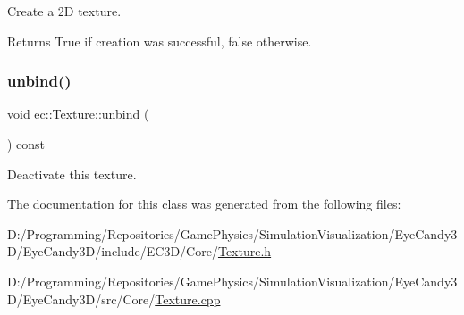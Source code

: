 Create a 2D texture. 

\begin{DoxyReturn}{Returns}
True if creation was successful, false otherwise. 
\end{DoxyReturn}
\mbox{\label{classec_1_1_texture_a95c72abc5c801df231fc970c6adffdcc}} 
\subsubsection{\texorpdfstring{unbind()}{unbind()}}
{\footnotesize\ttfamily void ec\+::\+Texture\+::unbind (\begin{DoxyParamCaption}{ }\end{DoxyParamCaption}) const}

Deactivate this texture. 

The documentation for this class was generated from the following files\+:\begin{DoxyCompactItemize}
\item 
D\+:/\+Programming/\+Repositories/\+Game\+Physics/\+Simulation\+Visualization/\+Eye\+Candy3\+D/\+Eye\+Candy3\+D/include/\+E\+C3\+D/\+Core/\mbox{\hyperlink{_texture_8h}{Texture.\+h}}\item 
D\+:/\+Programming/\+Repositories/\+Game\+Physics/\+Simulation\+Visualization/\+Eye\+Candy3\+D/\+Eye\+Candy3\+D/src/\+Core/\mbox{\hyperlink{_texture_8cpp}{Texture.\+cpp}}\end{DoxyCompactItemize}
